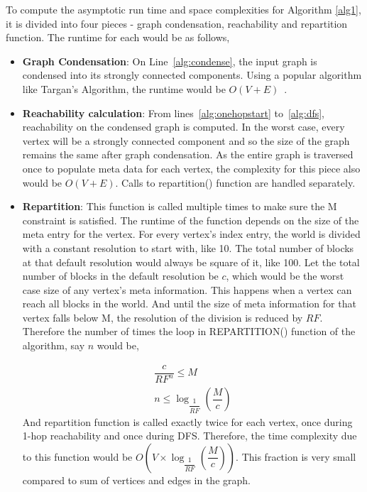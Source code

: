 To compute the asymptotic run time and space complexities for Algorithm \ref{alg1}, it is divided into four pieces - graph condensation, reachability and repartition function. The runtime for each would be as follows,
\begin{itemize}

  \item \textbf{Graph Condensation}: On Line~\ref{alg:condense}, the input graph is condensed into its strongly connected components. Using a popular algorithm like Targan's Algorithm, the runtime would be $O(V + E)$~\cite{R1972}.

  \item \textbf{Reachability calculation}: From lines~\ref{alg:onehopstart} to~\ref{alg:dfs}, reachability on the condensed graph is computed. In the worst case, every vertex will be a strongly connected component and so the size of the graph remains the same after graph condensation. As the entire graph is traversed once to populate meta data for each vertex, the complexity for this piece also would be $O(V + E)$. Calls to repartition() function are handled separately.


  \item \textbf{Repartition}: This function is called multiple times to make sure the M constraint is satisfied. The runtime of the function depends on the size of the meta entry for the vertex. For every vertex's index entry, the world is divided with a constant resolution to start with, like 10. The total number of blocks at that default resolution would always be square of it, like 100. Let the total number of blocks in the default resolution be $c$, which would be the worst case size of any vertex's meta information. This happens when a vertex can reach all blocks in the world. And until the size of meta information for that vertex falls below M, the resolution of the division is reduced by $RF$. Therefore the number of times the loop in REPARTITION() function of the algorithm, say $n$ would be,

  \begin{eqnarray*}
  	\dfrac{c}{RF^n} \leq M\\
  	n \leq {\log_{\dfrac{1}{RF}} (\dfrac{M}{c})}
  \end{eqnarray*}
  And repartition function is called exactly twice for each vertex, once during 1-hop reachability and once during DFS. Therefore, the time complexity due to this function would be $O(V \times {\log_{\dfrac{1}{RF}} (\dfrac{M}{c})})$. This fraction is very small compared to sum of vertices and edges in the graph.
\end{itemize}

